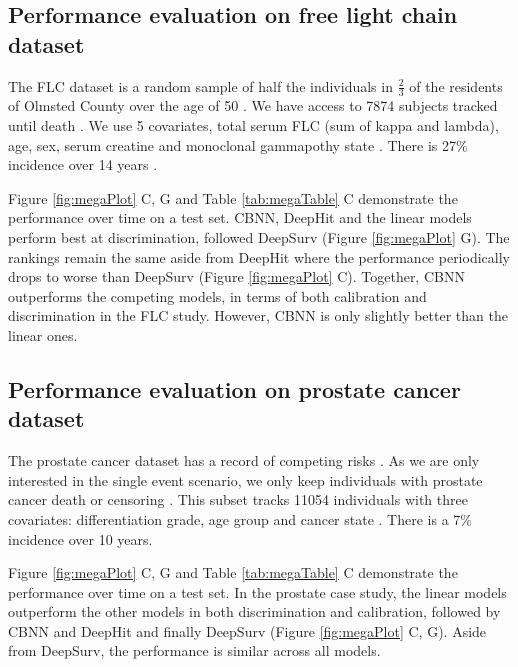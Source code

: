 \documentclass[APA,LATO1COL]{WileyNJD-v2}
\begin{document}
\hypertarget{pe-flc}{%
\subsection{Performance evaluation on free light chain dataset}\label{pe-flc}}
The FLC dataset is a random sample of half the individuals in $\frac{2}{3}$ of the
residents of Olmsted County over the age of 50 \citep{flc}. We have access to 7874 subjects
tracked until death \citep{flc}. We use 5 covariates, total serum FLC (sum of kappa and lambda), age, sex,
serum creatine and monoclonal gammapothy state \citep{flc}. There is 27\% incidence over 14 years \citep{flc}.

Figure \ref{fig:megaPlot} C, G and Table \ref{tab:megaTable} C
demonstrate the performance over time on a test set. CBNN, DeepHit and the linear models
perform best at discrimination, followed DeepSurv (Figure \ref{fig:megaPlot} G). The rankings
remain the same aside from DeepHit where the performance periodically drops
to worse than DeepSurv (Figure \ref{fig:megaPlot} C). Together, CBNN outperforms the competing models,
in terms of both calibration and discrimination in the FLC study. However, CBNN is only slightly better
than the linear ones.

\hypertarget{pe-prostate}{%
\subsection{Performance evaluation on prostate cancer dataset}\label{pe-prostate}}
The prostate cancer dataset has a record of competing risks \citep{prostate}. As we are only interested in the
single event scenario, we only keep individuals with prostate cancer death or censoring \citep{prostate}.
This subset tracks 11054 individuals with three covariates: differentiation grade, age group and cancer state \citep{prostate}.
There is a 7\% incidence over 10 years.

Figure \ref{fig:megaPlot} C, G and Table \ref{tab:megaTable} C demonstrate the
performance over time on a test set. In the prostate case study, the linear models
outperform the other models in both discrimination and calibration, followed by
CBNN and DeepHit and finally DeepSurv (Figure \ref{fig:megaPlot} C, G). Aside from DeepSurv,
the performance is similar across all models.


\end{document}

